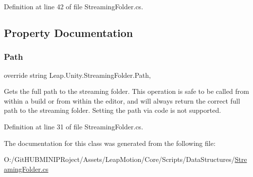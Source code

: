 Definition at line 42 of file Streaming\+Folder.\+cs.



\subsection{Property Documentation}
\mbox{\label{class_leap_1_1_unity_1_1_streaming_folder_a195bd6dd7475b2bf7836b8ce364c1ad7}} 
\subsubsection{\texorpdfstring{Path}{Path}}
{\footnotesize\ttfamily override string Leap.\+Unity.\+Streaming\+Folder.\+Path\hspace{0.3cm}{\ttfamily [get]}, {\ttfamily [set]}}



Gets the full path to the streaming folder. This operation is safe to be called from within a build or from within the editor, and will always return the correct full path to the streaming folder. Setting the path via code is not supported. 



Definition at line 31 of file Streaming\+Folder.\+cs.



The documentation for this class was generated from the following file\+:\begin{DoxyCompactItemize}
\item 
O\+:/\+Git\+H\+U\+B\+M\+I\+N\+I\+P\+Roject/\+Assets/\+Leap\+Motion/\+Core/\+Scripts/\+Data\+Structures/\mbox{\hyperlink{_streaming_folder_8cs}{Streaming\+Folder.\+cs}}\end{DoxyCompactItemize}
